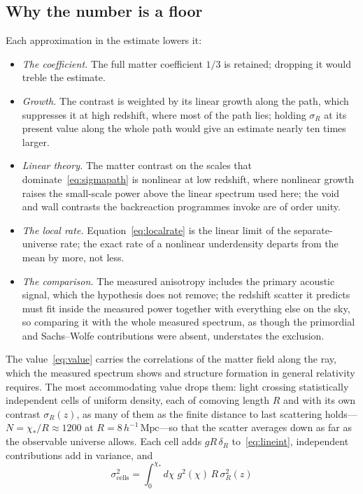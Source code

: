 \documentclass[11pt,a4paper]{article}
\begin{document}
\subsection{Why the number is a floor}

Each approximation in the estimate lowers it:
\begin{itemize}
\item \emph{The coefficient.} The full matter coefficient $1/3$ is retained; dropping it would treble the estimate.
\item \emph{Growth.} The contrast is weighted by its linear growth along the path, which suppresses it at high redshift, where most of the path lies; holding $\sigma_R$ at its present value along the whole path would give an estimate nearly ten times larger.
\item \emph{Linear theory.} The matter contrast on the scales that dominate~\eqref{eq:sigmapath} is nonlinear at low redshift, where nonlinear growth raises the small-scale power above the linear spectrum used here; the void and wall contrasts the backreaction programmes invoke are of order unity.
\item \emph{The local rate.} Equation~\eqref{eq:localrate} is the linear limit of the separate-universe rate; the exact rate of a nonlinear underdensity departs from the mean by more, not less.
\item \emph{The comparison.} The measured anisotropy includes the primary acoustic signal, which the hypothesis does not remove; the redshift scatter it predicts must fit inside the measured power together with everything else on the sky, so comparing it with the whole measured spectrum, as though the primordial and Sachs--Wolfe contributions were absent, understates the exclusion.
\end{itemize}
The value~\eqref{eq:value} carries the correlations of the matter field along the ray, which the measured spectrum shows and structure formation in general relativity requires. The most accommodating value drops them: light crossing statistically independent cells of uniform density, each of comoving length $R$ and with its own contrast $\sigma_R(z)$, as many of them as the finite distance to last scattering holds---$N=\chi_*/R\approx1200$ at $R=8\,h^{-1}\,\mathrm{Mpc}$---so that the scatter averages down as far as the observable universe allows. Each cell adds $gR\,\delta_R$ to~\eqref{eq:lineint}, independent contributions add in variance, and
\begin{equation}
\sigma^{2}_{\mathrm{cells}} = \int_0^{\chi_*} d\chi\; g^{2}(\chi)\,R\,\sigma_R^{2}(z)
\label{eq:floor}
\end{equation}
\end{document}
